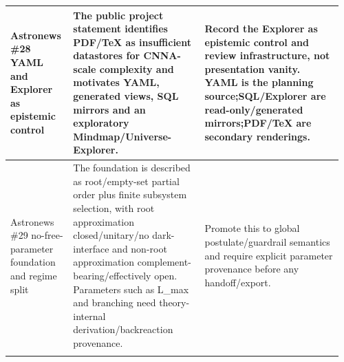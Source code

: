 \begin{longtable}{L{0.18\linewidth} L{0.38\linewidth} L{0.4\linewidth}}
\hline
\addlinespace[0.24em]
Astronews \#28 YAML and Explorer as epistemic control & The public project statement identifies PDF/\allowbreak{}TeX as insufficient datastores for CNNA-scale complexity and motivates YAML, generated views, SQL mirrors and an exploratory Mindmap/\allowbreak{}Universe-Explorer. & Record the Explorer as epistemic control and review infrastructure, not presentation vanity. YAML is the planning source;\newline SQL/\allowbreak{}Explorer are read-only/\allowbreak{}generated mirrors;\newline PDF/\allowbreak{}TeX are secondary renderings.\\
\hline
\addlinespace[0.24em]
Astronews \#29 no-free-parameter foundation and regime split & The foundation is described as root/\allowbreak{}empty-set partial order plus finite subsystem selection, with root approximation closed/\allowbreak{}unitary/\allowbreak{}no dark-interface and non-root approximation complement-bearing/\allowbreak{}effectively open. Parameters such as L\_max and branching need theory-internal derivation/\allowbreak{}backreaction provenance. & Promote this to global postulate/\allowbreak{}guardrail semantics and require explicit parameter provenance before any handoff/\allowbreak{}export.\\
\hline
\addlinespace[0.24em]
\end{longtable}
\normalsize
